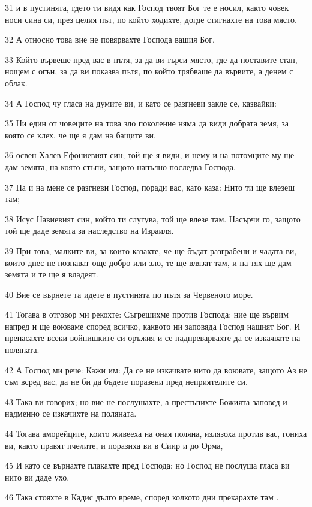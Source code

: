\par 31 и в пустинята, гдето ти видя как Господ твоят Бог те е носил, както човек носи сина си, през целия път, по който ходихте, догде стигнахте на това място.
\par 32 А относно това вие не повярвахте Господа вашия Бог.
\par 33 Който вървеше пред вас в пътя, за да ви търси място, где да поставите стан, нощем с огън, за да ви показва пътя, по който трябваше да вървите, а денем с облак.
\par 34 А Господ чу гласа на думите ви, и като се разгневи закле се, казвайки:
\par 35 Ни един от човеците на това зло поколение няма да види добрата земя, за която се клех, че ще я дам на бащите ви,
\par 36 освен Халев Ефониевият син; той ще я види, и нему и на потомците му ще дам земята, на която стъпи, защото напълно последва Господа.
\par 37 Па и на мене се разгневи Господ, поради вас, като каза: Нито ти ще влезеш там;
\par 38 Исус Навиевият син, който ти слугува, той ще влезе там. Насърчи го, защото той ще даде земята за наследство на Израиля.
\par 39 При това, малките ви, за които казахте, че ще бъдат разграбени и чадата ви, които днес не познават още добро или зло, те ще влязат там, и на тях ще дам земята и те ще я владеят.
\par 40 Вие се върнете та идете в пустинята по пътя за Червеното море.
\par 41 Тогава в отговор ми рекохте: Съгрешихме против Господа; ние ще вървим напред и ще воюваме според всичко, каквото ни заповяда Господ нашият Бог. И препасахте всеки войнишките си оръжия и се надпреварвахте да се изкачвате на поляната.
\par 42 А Господ ми рече: Кажи им: Да се не изкачвате нито да воювате, защото Аз не съм всред вас, да не би да бъдете поразени пред неприятелите си.
\par 43 Така ви говорих; но вие не послушахте, а престъпихте Божията заповед и надменно се изкачихте на поляната.
\par 44 Тогава аморейците, които живееха на оная поляна, излязоха против вас, гониха ви, както правят пчелите, и поразиха ви в Сиир и до Орма,
\par 45 И като се върнахте плакахте пред Господа; но Господ не послуша гласа ви нито ви даде ухо.
\par 46 Така стояхте в Кадис дълго време, според колкото дни прекарахте там .

